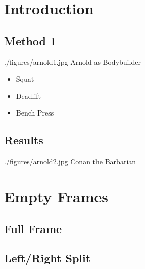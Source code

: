 \section{Introduction}
\subsection{Method 1}
{
    \Figure
    {./figures/arnold1.jpg}
    {Arnold as Bodybuilder}
}
{
\begin{itemize} 
\item<+-> Squat \cite{PumpingIron84}
\item<+-> Deadlift \cite{StartingStrength}
\item<+-> Bench Press
\end{itemize}
}%
\subsection{Results}
{
    \Figure
    {./figures/arnold2.jpg}
    {Conan the Barbarian}
}%



\section{Empty Frames}
\subsection{Full Frame}
\FrameFull{}{}%
{
}%
\subsection{Left/Right Split}
\FrameSplit{}{}%
{
}
{
}%
